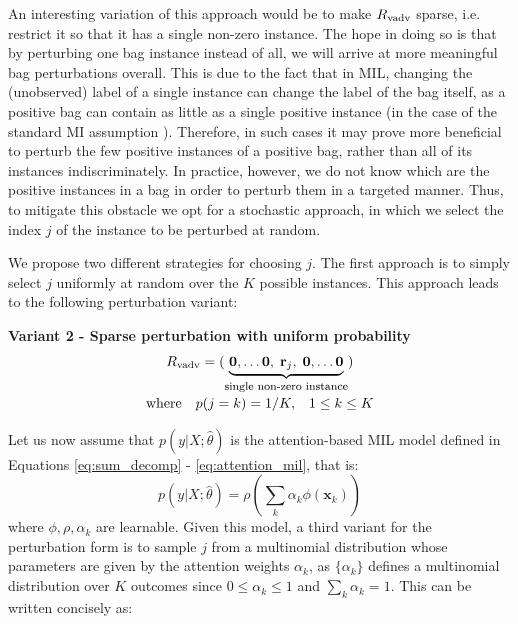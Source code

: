 \documentclass[journal,twoside,web]{ieeecolor}
\begin{document}
\vspace{3mm}

An interesting variation of this approach would be to make 
$R\textsubscript{vadv}$ sparse, i.e. restrict it so that it has a single
non-zero instance.
The hope in doing so is that by perturbing one bag instance instead of all, 
we will arrive at more meaningful bag perturbations overall. This is
due to the fact that in MIL,
changing the (unobserved) label of a single 
instance can change the label
of the bag itself, as a positive bag can contain as little as a single
positive instance (in the case of the standard MI assumption \cite{foulds2010review}).
Therefore, in such cases it may prove more beneficial
to perturb the few positive instances
of a positive bag, rather than all of its instances indiscriminately.
In practice, however, we do not know which are the positive instances
in a bag in order to perturb them in a targeted manner. Thus, to 
mitigate this obstacle we opt for a stochastic approach, in which
we select the index $j$ of the instance to be perturbed at random.

We propose two different strategies for choosing $j$. 
The first approach is to simply select $j$ uniformly at random over the $K$
possible instances. This approach leads to the following perturbation variant:

\begin{center}
  \textbf{Variant 2 - Sparse perturbation with uniform probability}
	\begin{gather*}
		R\textsubscript{vadv} = \left(\smash[b]{\underbrace{\mathbf{0}, \dots \mathbf{0}, \;\mathbf{r}_j, \;\mathbf{0}, \dots \mathbf{0}}_{\text{\footnotesize single non-zero instance}}} \right) \\\\
		\text{where} \quad p(j=k) = 1/K, \;\;\; 1 \leq k \leq K
	\end{gather*}
\end{center}

Let us now assume that $p(y|X;\hat{\theta})$ is the attention-based MIL model defined in Equations \ref{eq:sum_decomp} - \ref{eq:attention_mil}, that is:
\begin{equation}
p\left(y | X; \hat{\theta}\right) = 
\rho\left(\sum_k \alpha_k \phi\left(\mathbf{x}_k\right) \right)
\label{eq:class_score}
\end{equation}
where $\phi, \rho, \alpha_k$ are learnable. 
Given this model, a third variant for the
perturbation form is to sample $j$
from a multinomial distribution whose parameters are given by the attention
weights $\alpha_k$, as
$\{\alpha_k\}$ defines a multinomial distribution over $K$
outcomes since $0 \leq \alpha_k
\leq 1$ and $\sum_k \alpha_k = 1$. This can be written concisely as:
\end{document}
